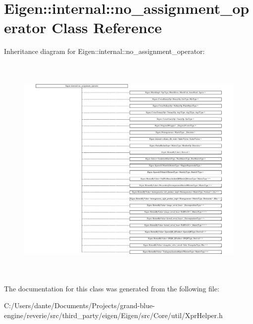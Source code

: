 \hypertarget{class_eigen_1_1internal_1_1no__assignment__operator}{}\section{Eigen\+::internal\+::no\+\_\+assignment\+\_\+operator Class Reference}
\label{class_eigen_1_1internal_1_1no__assignment__operator}
Inheritance diagram for Eigen\+::internal\+::no\+\_\+assignment\+\_\+operator\+:\begin{figure}[H]
\begin{center}
\leavevmode
\includegraphics[height=11.321928cm]{class_eigen_1_1internal_1_1no__assignment__operator}
\end{center}
\end{figure}


The documentation for this class was generated from the following file\+:\begin{DoxyCompactItemize}
\item 
C\+:/\+Users/dante/\+Documents/\+Projects/grand-\/blue-\/engine/reverie/src/third\+\_\+party/eigen/\+Eigen/src/\+Core/util/Xpr\+Helper.\+h\end{DoxyCompactItemize}
